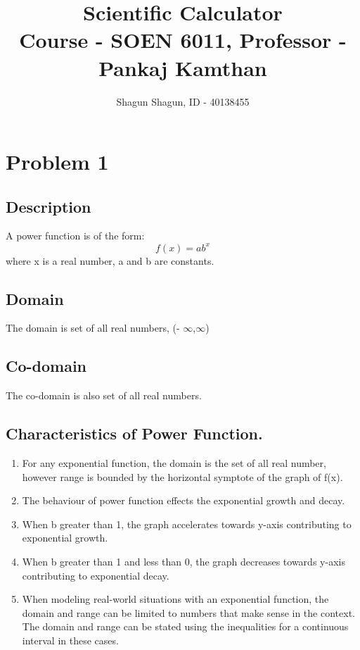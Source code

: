 \documentclass[a4paper,12pt]{article}
\title{Scientific Calculator\\
\large Course - SOEN 6011, Professor - Pankaj Kamthan}
\author{Shagun Shagun, ID - 40138455}
\date{}
\begin{document}
\maketitle %

\section{\large Problem 1}

\subsection{Description}
A power function is of the form:
\begin{equation} \label{Power_func}
	f(x) = ab^x
\end{equation}
where x is a real number, a and b are constants.


\subsection{Domain}
The domain is set of all real numbers,  (- $\infty$,$\infty$)

\subsection{Co-domain}
The co-domain is also set of all real numbers.


\subsection{Characteristics of Power Function.}
\begin{enumerate}
\item For any exponential function, the domain is the set of all real number, however range is bounded by the horizontal symptote of the graph of f(x).

\item The behaviour of power function effects the exponential growth and decay.
\item When b greater than 1, the graph accelerates towards y-axis contributing to exponential growth.
\item When b greater than 1 and less than 0, the graph decreases towards y-axis contributing to exponential decay.
\item When modeling real-world situations with an exponential function, the domain and range can be limited to numbers that make sense in the context. The domain and range can be stated using the inequalities for a continuous interval in these cases.

\end{enumerate}
\end{document}
